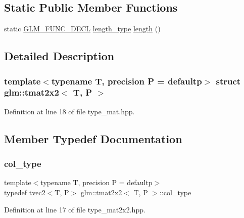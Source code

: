 \subsection*{Static Public Member Functions}
\begin{DoxyCompactItemize}
\item 
static \mbox{\hyperlink{setup_8hpp_ab2d052de21a70539923e9bcbf6e83a51}{G\+L\+M\+\_\+\+F\+U\+N\+C\+\_\+\+D\+E\+CL}} \mbox{\hyperlink{structglm_1_1tmat2x2_a89bfd406715f8c3ae1c1f503d640fbb6}{length\+\_\+type}} \mbox{\hyperlink{structglm_1_1tmat2x2_ace332602fd29965128159cc5cae051c3}{length}} ()
\end{DoxyCompactItemize}


\subsection{Detailed Description}
\subsubsection*{template$<$typename T, precision P = defaultp$>$\newline
struct glm\+::tmat2x2$<$ T, P $>$}



Definition at line 18 of file type\+\_\+mat.\+hpp.



\subsection{Member Typedef Documentation}
\mbox{\label{structglm_1_1tmat2x2_a9e4690f52926b475b36ed5f6209f22f4}} 
\subsubsection{\texorpdfstring{col\_type}{col\_type}}
{\footnotesize\ttfamily template$<$typename T, precision P = defaultp$>$ \\
typedef \mbox{\hyperlink{structglm_1_1tvec2}{tvec2}}$<$T, P$>$ \mbox{\hyperlink{structglm_1_1tmat2x2}{glm\+::tmat2x2}}$<$ T, P $>$\+::\mbox{\hyperlink{structglm_1_1tmat2x2_a9e4690f52926b475b36ed5f6209f22f4}{col\+\_\+type}}}



Definition at line 17 of file type\+\_\+mat2x2.\+hpp.

